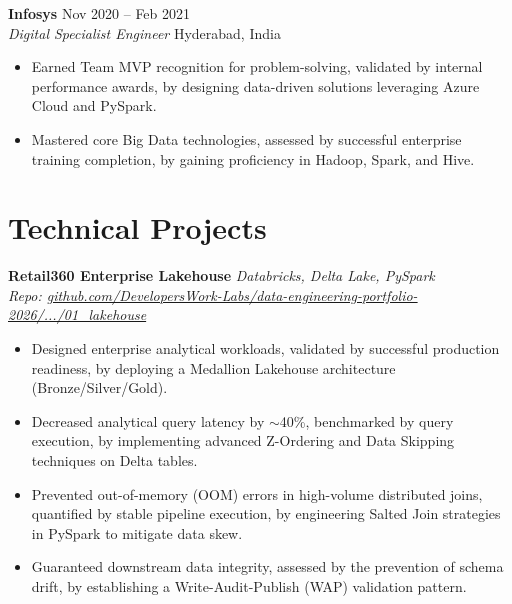 \documentclass[10pt, letterpaper]{article}
\begin{document}
\vspace{4pt}

\noindent \textbf{Infosys} \hfill Nov 2020 -- Feb 2021 \\
\textit{Digital Specialist Engineer} \hfill Hyderabad, India
\begin{itemize}[leftmargin=0.25in, itemsep=1pt]
    \item Earned Team MVP recognition for problem-solving, validated by internal performance awards, by designing data-driven solutions leveraging Azure Cloud and PySpark.
    \item Mastered core Big Data technologies, assessed by successful enterprise training completion, by gaining proficiency in Hadoop, Spark, and Hive.
\end{itemize}

\section{Technical Projects}

\noindent \textbf{Retail360 Enterprise Lakehouse} \hfill \textit{Databricks, Delta Lake, PySpark} \\
\textit{Repo: \href{https://github.com/DevelopersWork-Labs/data-engineering-portfolio-2026/tree/main/projects/01_lakehouse}{github.com/DevelopersWork-Labs/data-engineering-portfolio-2026/.../01\_lakehouse}}
\begin{itemize}[leftmargin=0.25in, itemsep=1pt]
    \item Designed enterprise analytical workloads, validated by successful production readiness, by deploying a Medallion Lakehouse architecture (Bronze/Silver/Gold).
    \item Decreased analytical query latency by $\sim$40\%, benchmarked by query execution, by implementing advanced Z-Ordering and Data Skipping techniques on Delta tables.
    \item Prevented out-of-memory (OOM) errors in high-volume distributed joins, quantified by stable pipeline execution, by engineering Salted Join strategies in PySpark to mitigate data skew.
    \item Guaranteed downstream data integrity, assessed by the prevention of schema drift, by establishing a Write-Audit-Publish (WAP) validation pattern.
\end{itemize}

\vspace{2pt}
\end{document}
